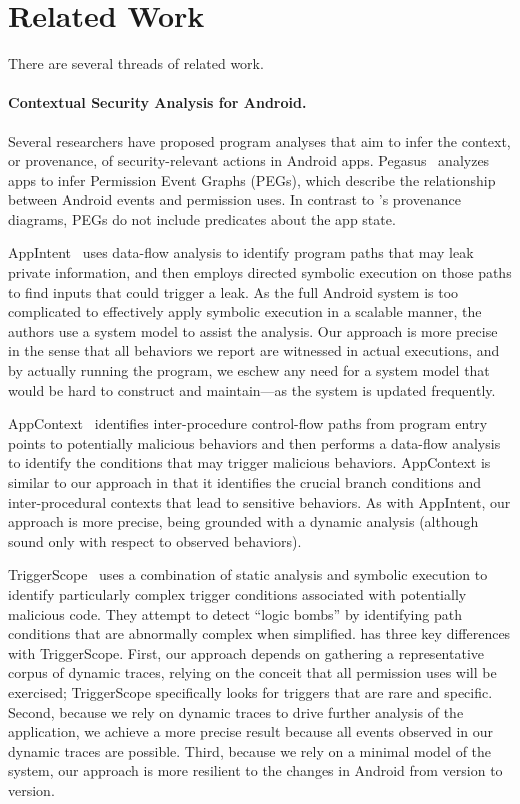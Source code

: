 \section{Related Work}
\label{sec:related}
There are several threads of related work.

\paragraph*{Contextual Security Analysis for Android.}

Several researchers have proposed program analyses that aim to infer
the context, or provenance, of security-relevant actions in
Android apps. Pegasus~\cite{chen2013} analyzes apps to infer
Permission Event Graphs (PEGs), which describe the relationship
between Android events and permission uses. In contrast to
\hogarth{}'s provenance diagrams, PEGs do not include predicates
about the app state.

AppIntent~\cite{Yang2013} uses data-flow analysis to identify program
paths that may leak private information, and then employs directed
symbolic execution on those paths to find inputs that could trigger a
leak. As the full Android system is too complicated to effectively apply
symbolic execution in a scalable manner, the authors use a system model
to assist the analysis. Our approach is more precise in the sense that
all behaviors we report are witnessed in actual executions, and by
actually running the program, we eschew any need for a system model
that would be hard to construct and maintain---as the system is updated frequently.

AppContext~\cite{Yang2015b} identifies inter-procedure control-flow paths
from program entry points to potentially malicious behaviors and then
performs a data-flow analysis to identify the conditions that may
trigger malicious behaviors. AppContext is similar to our approach
in that it identifies the crucial branch conditions and inter-procedural
contexts that lead to sensitive behaviors. As with AppIntent, our approach is
more precise, being grounded with a dynamic analysis
(although sound only with respect to observed behaviors).

TriggerScope~\cite{Fratantonio2016} uses a combination of static analysis
and symbolic execution to identify particularly complex trigger conditions
associated with potentially malicious code. They attempt to detect ``logic bombs''
by identifying path conditions that are abnormally complex when simplified.
\hogarth{} has three key differences with TriggerScope.
First, our approach depends on gathering a representative corpus of
dynamic traces, relying on the conceit that all permission uses will be
exercised; TriggerScope specifically looks for triggers that are rare
and specific.
Second, because we rely on dynamic traces to drive further analysis of
the application, we achieve a more precise result because all
events observed in our dynamic traces are possible.  Third, because
we rely on a minimal model of the system, our approach is more
resilient to the changes in Android from version to version.

